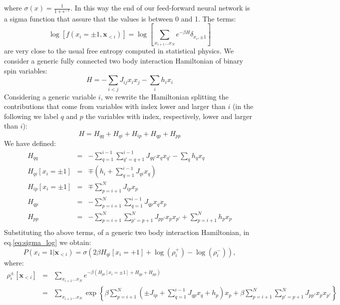 \documentclass{article}
\begin{document}
where $\sigma(x)=\frac{1}{1+e^{-x}}$. In this way the end of our feed-forward neural network is a sigma function that assure that the values is
between 0 and 1. The terms:
\begin{equation}
\log\left[f\left(x_{i}=\pm 1,\mathbf{x}_{<i}\right)\right] = \log \left[ \sum_{x_{i+1}\dots x_{N}}e^{-\beta H}\delta_{x_i, \pm1} \right] 
\end{equation}
are very close to the usual free entropy computed in statistical physics.
We consider a generic fully connected two body interaction Hamiltonian of binary spin variables:
\begin{equation}
    H = -\sum_{i<j} J_{ij} x_i x_j - \sum_{i} h_i x_i
\end{equation}
Considering a generic variable $i$, we rewrite the Hamiltonian splitting the contributions that come from variables with index lower and larger than $i$ (in the following we label $q$ and $p$ the variables with index, respectively, lower and larger than $i$):
\begin{equation}
    H = H_{qq} + H_{qi} + H_{ip} + H_{qp} + H_{pp}
\end{equation}
We have defined:
\begin{eqnarray}
    H_{qq} & = & - \sum_{q=1}^{i-1}\sum_{q'=q+1}^{i-1} J_{qq'} x_q x_{q'} - \sum_{q} h_q x_q \\
    H_{qi}[x_i = \pm 1] & = & \mp \left(h_i + \sum_{q=1}^{i-1} J_{qi} x_q\right)\\
    H_{ip}[x_i = \pm 1] & = & \mp \sum_{p=i+1}^{N} J_{ip} x_p \\
    H_{qp} & = & - \sum_{p=i+1}^{N}\sum_{q=1}^{i-1} J_{qp} x_q x_p\\
    H_{pp} & = & - \sum_{p=i+1}^{N}\sum_{p'=p+1}^{N} J_{pp'} x_p x_{p'} + \sum_{p=i+1}^N h_p x_p\\
\end{eqnarray}
Substituting tho above terms, of a generic two body interaction Hamiltonian, in eq.\ref{eq:sigma_log} we obtain:
\begin{equation}
P\left(x_{i}=1|\mathbf{x}_{<i}\right) = \sigma\left( 
 2 \beta H_{qi}[x_i = +1] +\log(\rho_i^+) - \log(\rho_i^-)
\right),
\end{equation}
where:
\begin{eqnarray}
\rho_i^{\pm}[\mathbf{x}_{<i}] &=& \sum_{x_{i+1}\dots x_{N}} e^{-\beta \left(
H_{pi}[x_i = \pm 1] + H_{qp} + H_{pp}\right)} \\
& = & \sum_{x_{i+1}\dots x_{N}} \exp\left\{
\beta\sum_{p=i+1}^{N}\left( \pm J_{ip} + \sum_{q=1}^{i-1} J_{qp} x_q + h_p \right) x_p + \beta\sum_{p=i+1}^{N}\sum_{p'=p+1}^{N} J_{pp'} x_p x_{p'}
\right\}
\end{eqnarray}
\end{document}
